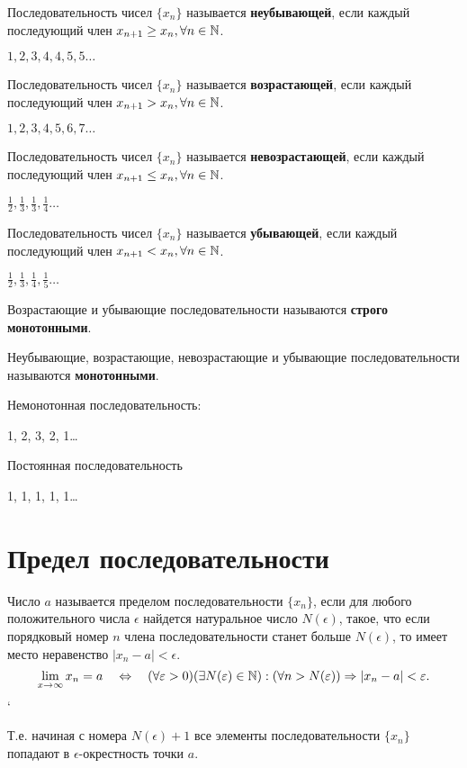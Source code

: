 Последовательность чисел $\{x_{n}\}$ называется \textbf{неубывающей}, если каждый последующий член $x_{n+1} \ge x_{n}, \forall n\in \mathbb{N}$.
\begin{eg}
  $1, 2, 3, 4, 4, 5, 5\ldots$
\end{eg}

Последовательность чисел $\{x_{n}\} $ называется \textbf{возрастающей}, если каждый последующий член $x_{n+1} > x_{n}, \forall n \in \mathbb{N}$.
\begin{eg}
  $1, 2, 3, 4, 5, 6, 7\ldots$
\end{eg}

Последовательность чисел $\{x_{n}\} $ называется \textbf{невозрастающей}, если каждый последующий член $x_{n+1} \le x_{n}, \forall n \in \mathbb{N}$.
\begin{eg}
  $\frac{1}{2}, \frac{1}{3}, \frac{1}{3}, \frac{1}{4}\ldots $
\end{eg}

Последовательность чисел $\{x_{n}\} $ называется \textbf{убывающей}, если каждый последующий член $x_{n+1} < x_{n}, \forall n \in \mathbb{N}$.
\begin{eg}
  $\frac{1}{2}, \frac{1}{3}, \frac{1}{4}, \frac{1}{5}\ldots$
\end{eg}

Возрастающие и убывающие последовательности называются \textbf{строго монотонными}.

Неубывающие, возрастающие, невозрастающие и убывающие последовательности называются \textbf{монотонными}.

Немонотонная последовательность:
\begin{eg}
  1, 2, 3, 2, 1\ldots
\end{eg}

Постоянная последовательность
\begin{eg}
  1, 1, 1, 1, 1\ldots
\end{eg}

\section{Предел последовательности}

\begin{definition}
Число $a$ называется пределом последовательности $\{x_{n}\} $, если для любого положительного числа $\epsilon$ найдется натуральное число  $N\left(\epsilon  \right) $, такое, что если порядковый номер $n$ члена последовательности станет больше $N(\epsilon)$, то имеет место неравенство  $|x_{n} - a| < \epsilon$.
\[
\lim_{x \to \infty} x_{n} = a \quad \iff \quad
(\forall \epsilon > 0)(\exists N(\epsilon) \in \N) : (\forall n > N(\epsilon)) \implies |x_{n}-a| < \epsilon
.\] `
\end{definition}
\begin{note}
  Т.е. начиная с номера $N(\epsilon) + 1$ все элементы последовательности $\{x_{n}\} $ попадают в $\epsilon$-окрестность точки $a$.
\end{note}

